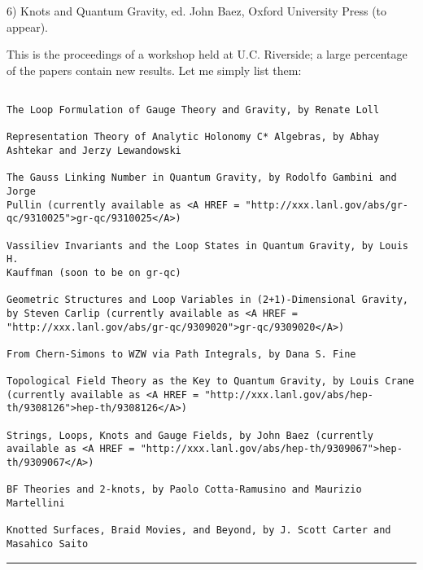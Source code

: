 6) Knots and Quantum Gravity, ed. John Baez, Oxford University Press (to
appear).  

This is the proceedings of a workshop held at U.C. Riverside; a large
percentage of the papers contain new results.  Let me simply list them:


\begin{verbatim}

The Loop Formulation of Gauge Theory and Gravity, by Renate Loll

Representation Theory of Analytic Holonomy C* Algebras, by Abhay
Ashtekar and Jerzy Lewandowski 

The Gauss Linking Number in Quantum Gravity, by Rodolfo Gambini and Jorge
Pullin (currently available as <A HREF = "http://xxx.lanl.gov/abs/gr-qc/9310025">gr-qc/9310025</A>)

Vassiliev Invariants and the Loop States in Quantum Gravity, by Louis H.
Kauffman (soon to be on gr-qc)

Geometric Structures and Loop Variables in (2+1)-Dimensional Gravity,
by Steven Carlip (currently available as <A HREF = "http://xxx.lanl.gov/abs/gr-qc/9309020">gr-qc/9309020</A>)

From Chern-Simons to WZW via Path Integrals, by Dana S. Fine

Topological Field Theory as the Key to Quantum Gravity, by Louis Crane
(currently available as <A HREF = "http://xxx.lanl.gov/abs/hep-th/9308126">hep-th/9308126</A>)

Strings, Loops, Knots and Gauge Fields, by John Baez (currently
available as <A HREF = "http://xxx.lanl.gov/abs/hep-th/9309067">hep-th/9309067</A>)

BF Theories and 2-knots, by Paolo Cotta-Ramusino and Maurizio Martellini

Knotted Surfaces, Braid Movies, and Beyond, by J. Scott Carter and
Masahico Saito 
\end{verbatim}
    
\par\noindent\rule{\textwidth}{0.4pt}

